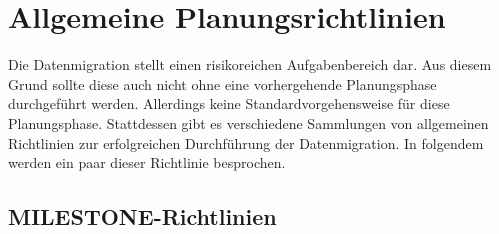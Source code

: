 \section{Allgemeine Planungsrichtlinien}

Die Datenmigration stellt einen risikoreichen Aufgabenbereich dar. Aus diesem Grund sollte diese auch nicht ohne eine vorhergehende Planungsphase durchgeführt werden. Allerdings keine Standardvorgehensweise für diese Planungsphase.\cite[S. 3]{wuLawless-1997} Stattdessen gibt es verschiedene Sammlungen von allgemeinen Richtlinien zur erfolgreichen Durchführung der Datenmigration. In folgendem werden ein paar dieser Richtlinie besprochen.

\subsection{MILESTONE-Richtlinien}


